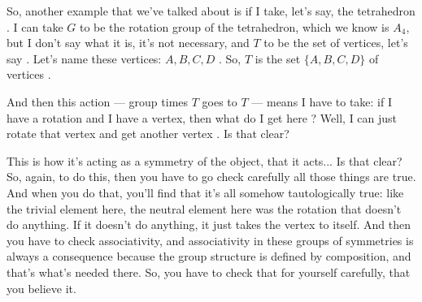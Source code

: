 \begin{speech}[00:55:38 - 00:57:10]
So, another example that we've talked about is if I take, let's say, the tetrahedron . I can take $G$ to be the rotation group of the tetrahedron, which we know is $A_4$, but I don't say what it is, it's not necessary, and $T$ to be the set of vertices, let's say . Let's name these vertices: $A, B, C, D$ . So, $T$ is the set $\{A, B, C, D\}$ of vertices .

And then this action --- group times $T$ goes to $T$ --- means I have to take: if I have a rotation and I have a vertex, then what do I get here ? Well, I can just rotate that vertex and get another vertex . Is that clear?

This is how it's acting as a symmetry of the object, that it acts... Is that clear? So, again, to do this, then you have to go check carefully all those things are true. And when you do that, you'll find that it's all somehow tautologically true: like the trivial element here, the neutral element here was the rotation that doesn't do anything. If it doesn't do anything, it just takes the vertex to itself. And then you have to check associativity, and associativity in these groups of symmetries is always a consequence because the group structure is defined by composition, and that's what's needed there. So, you have to check that for yourself carefully, that you believe it.
\end{speech}

